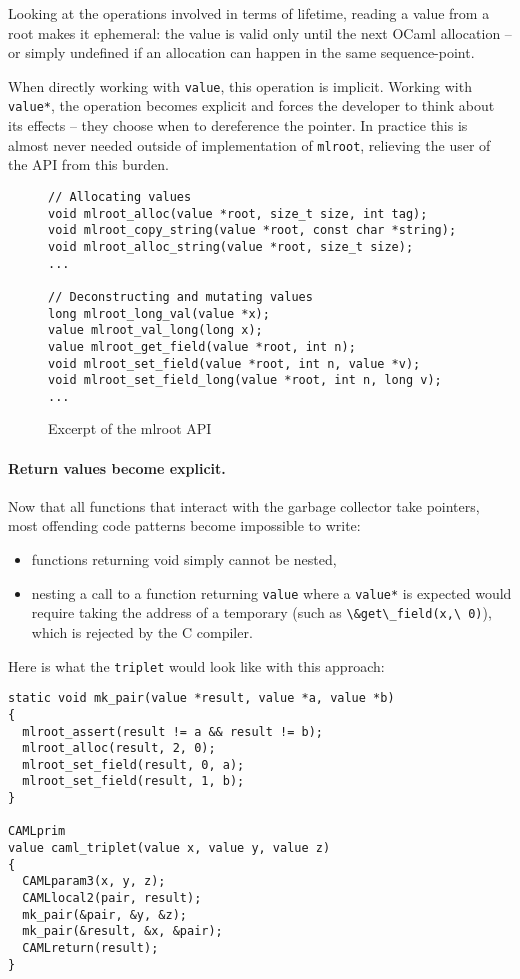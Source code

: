 \documentclass[a4paper]{easychair}
\newcommand{\cpp}[1]{\lstinline[style=C++]{#1}}
\begin{document}
Looking at the operations involved in terms of lifetime, reading a value
from a root makes it ephemeral: the value is valid only until the next
OCaml allocation -- or simply undefined if an allocation can happen in
the same sequence-point.

When directly working with \cpp{value}, this operation is implicit.
Working with \cpp{value*}, the operation becomes explicit and forces
the developer to think about its effects -- they choose when to
dereference the pointer.
In practice this is almost never needed outside of implementation of
\cpp{mlroot}, relieving the user of the API from this burden.

\begin{figure}[htbp]
\begin{lstlisting}[style=C++]
// Allocating values
void mlroot_alloc(value *root, size_t size, int tag);
void mlroot_copy_string(value *root, const char *string);
void mlroot_alloc_string(value *root, size_t size);
...
    
// Deconstructing and mutating values
long mlroot_long_val(value *x);
value mlroot_val_long(long x);
value mlroot_get_field(value *root, int n);
void mlroot_set_field(value *root, int n, value *v);
void mlroot_set_field_long(value *root, int n, long v);
...
\end{lstlisting}
  \caption{Excerpt of the mlroot API}
  \label{fig:mlroot}
\end{figure}

\paragraph{Return values become explicit.}

Now that all functions that interact with the garbage collector take
pointers, most offending code patterns become impossible to write:
%
\begin{itemize}
\item functions returning void simply cannot be nested,
\item nesting a call to a function returning \cpp{value} where a
      \cpp{value*} is expected would require taking the address of a
      temporary (such as \cpp{\&get\_field(x,\ 0)}), which is rejected by the C
      compiler.
\end{itemize}

Here is what the \cpp{triplet} would look like with this approach:
%
\begin{lstlisting}[style=C++]
static void mk_pair(value *result, value *a, value *b)
{
  mlroot_assert(result != a && result != b);
  mlroot_alloc(result, 2, 0);
  mlroot_set_field(result, 0, a);
  mlroot_set_field(result, 1, b);
}

CAMLprim
value caml_triplet(value x, value y, value z)
{
  CAMLparam3(x, y, z);
  CAMLlocal2(pair, result);
  mk_pair(&pair, &y, &z);
  mk_pair(&result, &x, &pair);
  CAMLreturn(result);
}
\end{lstlisting}
\end{document}
